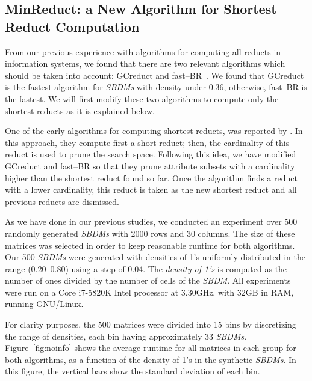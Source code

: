 \documentclass[authoryear,11pt]{elsarticle}
\begin{document}
\subsection{MinReduct: a New Algorithm for Shortest Reduct Computation}\label{evaluation}
  
  From our previous experience with algorithms for computing all reducts in information systems, we found that there are two  relevant algorithms which should be taken into account: GCreduct and fast--BR~\citep{Lias13}. We found that GCreduct is the fastest algorithm for \textit{SBDMs} with density under 0.36, otherwise, fast--BR is the fastest. We will first modify these two algorithms to compute only the shortest reducts as it is explained below.
  
  One of the early algorithms for computing shortest reducts, was reported by \cite{Lin04}. In this approach, they compute first a short reduct; then, the cardinality of this reduct is used to prune the search space. Following this idea, we have modified GCreduct and fast--BR so that they prune attribute subsets with a cardinality higher than the shortest reduct found so far. Once the algorithm finds a reduct with a lower cardinality, this reduct is taken as the new shortest reduct and all previous reducts are dismissed.

  As we have done in our previous studies, we conducted an experiment over 500 randomly generated \textit{SBDMs} with 2000 rows and 30 columns. The size of these matrices was selected in order to keep reasonable runtime for both algorithms. Our 500 \textit{SBDMs} were generated with densities of 1's uniformly distributed in the range (0.20--0.80) using a step of 0.04. The \emph{density of 1's} is computed as the number of ones divided by the number of cells of the \textit{SBDM}. All experiments were run on a Core i7-5820K Intel processor at 3.30GHz, with 32GB in RAM, running GNU/Linux.
  
  For clarity purposes, the 500 matrices were divided into 15 bins by discretizing the range of densities, each bin having approximately 33 \textit{SBDMs}. Figure~\ref{fig:noinfo} shows the average runtime for all  matrices in each group for both algorithms, as a function of the density of 1's in the synthetic \textit{SBDMs}. In this figure, the vertical bars show the standard deviation of each bin.
  
\end{document}

